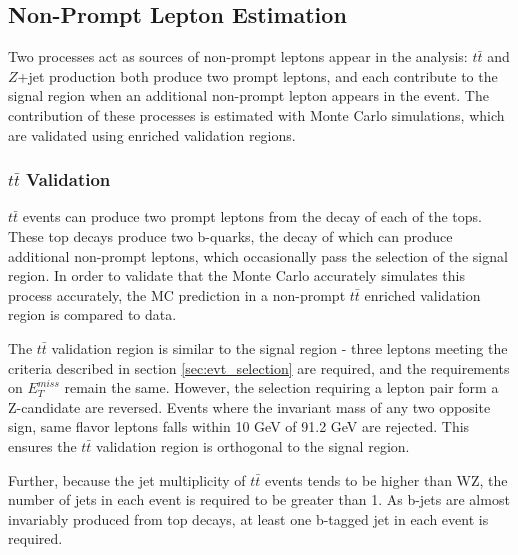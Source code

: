 \subsection{Non-Prompt Lepton Estimation}
\label{sec:fakes}

Two processes act as sources of non-prompt leptons appear in the analysis: $t\bar{t}$ and $Z$+jet production both produce two prompt leptons, and each contribute to the signal region when an additional non-prompt lepton appears in the event. The contribution of these processes is estimated with Monte Carlo simulations, which are validated using enriched validation regions.

\subsubsection{$t\bar{t}$ Validation}

$t\bar{t}$ events can produce two prompt leptons from the decay of each of the tops. These top decays produce two b-quarks, the decay of which can produce additional non-prompt leptons, which occasionally pass the selection of the signal region. In order to validate that the Monte Carlo accurately simulates this process accurately, the MC prediction in a non-prompt $t\bar{t}$ enriched validation region is compared to data.

The $t\bar{t}$ validation region is similar to the signal region - three leptons meeting the criteria described in section \ref{sec:evt_selection} are required, and the requirements on $E_T^{miss}$ remain the same. However, the selection requiring a lepton pair form a Z-candidate are reversed. Events where the invariant mass of any two opposite sign, same flavor leptons falls within 10 GeV of 91.2 GeV are rejected. This ensures the $t\bar{t}$ validation region is orthogonal to the signal region. 

Further, because the jet multiplicity of $t\bar{t}$ events tends to be higher than WZ, the number of jets in each event is required to be greater than 1. As b-jets are almost invariably produced from top decays, at least one b-tagged jet in each event is required. 



